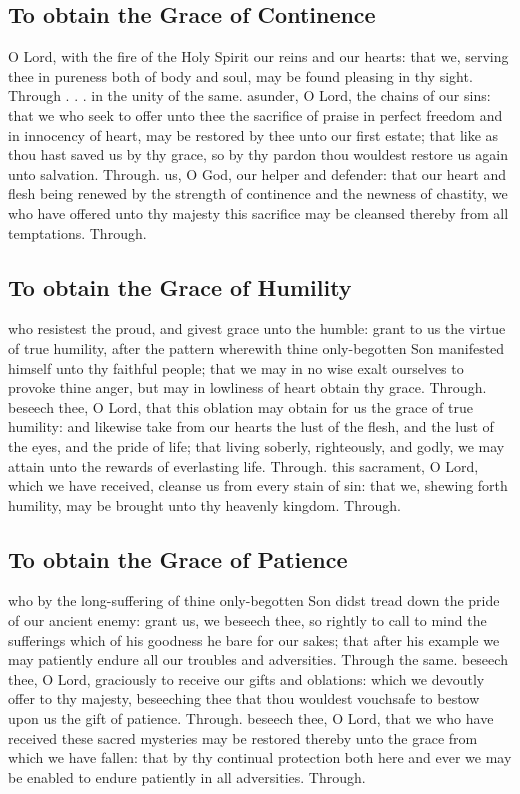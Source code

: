 \begin{multicols}{2}
\subsection{To obtain the Grace of Continence}
\collect
{} O Lord, with the fire of the Holy Spirit our reins and our hearts: that we, serving thee in pureness both of body and soul, may be found pleasing in thy sight. Through . . . in the unity of the same.
\secret
{} asunder, O Lord, the chains of our sins: that we who seek to offer unto thee the sacrifice of praise in perfect freedom and in innocency of heart, may be restored by thee unto our first estate; that like as thou hast saved us by thy grace, so by thy pardon thou wouldest restore us again unto salvation. Through.
\postcommunion
{} us, O God, our helper and defender: that our heart and flesh being renewed by the strength of continence and the newness of chastity, we who have offered unto thy majesty this sacrifice may be cleansed thereby from all temptations. Through.

\subsection{To obtain the Grace of Humility}
\collect
{} who resistest the proud, and givest grace unto the humble: grant to us the virtue of true humility, after the pattern wherewith thine only-begotten Son manifested himself unto thy faithful people; that we may in no wise exalt ourselves to provoke thine anger, but may in lowliness of heart obtain thy grace. Through.
\secret
{} beseech thee, O Lord, that this oblation may obtain for us the grace of true humility: and likewise take from our hearts the lust of the flesh, and the lust of the eyes, and the pride of life; that living soberly, righteously, and godly, we may attain unto the rewards of everlasting life. Through.
\postcommunion
{} this sacrament, O Lord, which we have received, cleanse us from every stain of sin: that we, shewing forth humility, may be brought unto thy heavenly kingdom. Through.

\subsection{To obtain the Grace of Patience}
\collect
{} who by the long-suffering of thine only-begotten Son didst tread down the pride of our ancient enemy: grant us, we beseech thee, so rightly to call to mind the sufferings which of his goodness he bare for our sakes; that after his example we may patiently endure all our troubles and adversities. Through the same.
\secret
{} beseech thee, O Lord, graciously to receive our gifts and oblations: which we devoutly offer to thy majesty, beseeching thee that thou wouldest vouchsafe to bestow upon us the gift of patience. Through.
\postcommunion
{} beseech thee, O Lord, that we who have received these sacred mysteries may be restored thereby unto the grace from which we have fallen: that by thy continual protection both here and ever we may be enabled to endure patiently in all adversities. Through.


\end{multicols}
